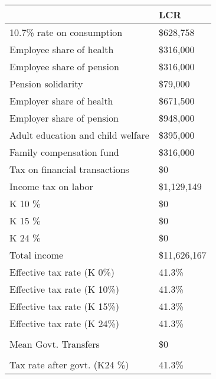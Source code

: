 \documentclass[12pt]{article}
\begin{document}
\begin{table}[]
\label{table:tcity}
\footnotesize
\begin{tabular}{ll} \hline
&LCR                                             \\ \hline
10.7\% rate on consumption        & \$628,758    \\
Employee share of health          & \$316,000    \\
Employee share of pension         & \$316,000    \\
Pension solidarity                & \$79,000     \\
Employer share of health          & \$671,500    \\
Employer share of pension         & \$948,000    \\
Adult education and child welfare & \$395,000    \\
Family compensation fund          & \$316,000    \\
Tax on financial transactions     & \$0          \\
Income tax on labor               & \$1,129,149  \\
K 10 \%                           & \$0          \\
K 15 \%                           & \$0          \\
K 24 \%                           & \$0          \\
Total income                      & \$11,626,167 \\
Effective tax rate (K 0\%)        & 41.3\%       \\
Effective tax rate (K 10\%)       & 41.3\%       \\
Effective tax rate (K 15\%)       & 41.3\%       \\
Effective tax rate (K 24\%)       & 41.3\%       \\
                                  &              \\
Mean Govt. Transfers              & \$0          \\
                                  &              \\
Tax rate after govt. (K24 \%)     & 41.3\%      \\ \hline
\end{tabular}
\end{table}
\end{document}
